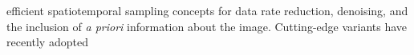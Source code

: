 efficient spatiotemporal sampling concepts for
data rate reduction,
denoising, and
the inclusion of
\emph{a priori} information about
the image.
Cutting-edge variants
\cite{article:OzkanITUFFC2018,article:BessonITUFFC2018,article:BessonITUFFC2016,article:DavidJASA2015,proc:SchiffnerIUS2013a,article:ZhangUlt2013,proc:SchiffnerIUS2012,article:SchiffnerBMT2012,proc:SchiffnerIUS2011}
have recently adopted
